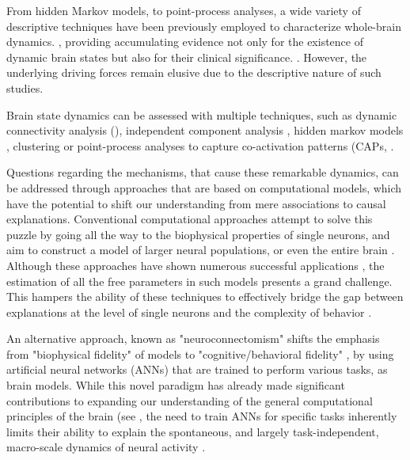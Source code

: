 \documentclass{article}
\begin{document}
From hidden Markov models, to point-process analyses, a wide variety of descriptive techniques have been previously
employed to characterize whole-brain dynamics. \citep{smith2012temporally, vidaurre2017brain, liu2013time, chen2018human},
providing accumulating evidence not only for the existence of dynamic brain states but also for their clinical
significance. \citep{hutchison2013dynamic, barttfeld2015signature, meer2020movie}.
However, the underlying driving forces remain elusive due to the descriptive nature of such studies.

Brain state dynamics can be assessed with multiple techniques, such as dynamic connectivity analysis (), independent
component analysis \citep{smith2012temporally}, hidden markov models \citep{vidaurre2017brain},
clustering \citep{chen2018human} or point-process analyses to
capture co-activation patterns (CAPs, \citep{liu2013time, chen2015introducing, liu2013decomposition, meer2020movie}.

Questions regarding the mechanisms, that cause these remarkable dynamics, can be addressed through approaches that are
based on computational models, which have the potential to shift our understanding from mere associations to causal
explanations.
Conventional computational approaches attempt to solve this puzzle by going all the way to the biophysical properties
of single neurons, and aim to construct a model of larger neural populations, or even the entire brain
\citep{breakspear2017dynamic}.
Although these approaches have shown numerous successful applications \citep{kriegeskorte2018cognitive, heinz2019towards},
the estimation of all the free parameters in such models presents a grand challenge.
This hampers the ability of these techniques to effectively bridge the gap between explanations at the level of single
neurons and the complexity of behavior \citep{breakspear2017dynamic}.

An alternative approach, known as "neuroconnectomism" \citep{doerig2023neuroconnectionist} shifts the
emphasis from "biophysical fidelity" of models to "cognitive/behavioral fidelity"
\citep{kriegeskorte2018cognitive}, by using artificial neural networks (ANNs) that are trained to
perform various tasks, as brain models.
While this novel paradigm has already made significant contributions to expanding our understanding of the general
computational principles of the brain (see \citep{doerig2023neuroconnectionist}, the need to train ANNs for
specific tasks inherently limits their ability to explain the spontaneous, and largely task-independent, macro-scale
dynamics of neural activity \citep{richards2019deep}.
\end{document}
